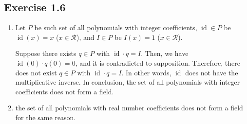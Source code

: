 \documentclass{article}
\theoremstyle{thmstyleone}
\theoremstyle{thmstyletwo}
\theoremstyle{thmstylethree}
\newcommand\R{\mathcal R}
\DeclareMathOperator \id{id}
\begin{document}
\subsection{Exercise 1.6}
\begin{enumerate}[label = (\alph*)]
\item
Let $P$ be such set of all polynomials with integer coefficients, %
$\id \in P$ be $\id(x) = x$ ($x \in \R$), and 
$I \in P$ be $I(x) = 1$ ($x \in \R$).

Suppose there exists $q \in P$ with ${\id} \cdot q = I$.
Then, we have $\id(0) \cdot q(0) = 0$, and it is contradicted to supposition.
Therefore, there does not exist  $q \in P$ with ${\id} \cdot q = I$. In other words, $\id$ does not have the multiplicative inverse.
In conclusion, the set of all polynomials with integer coefficients does not form a field.   
\item
the set of all polynomials with real number coefficients does not form a field for the same reason.   
\end{enumerate}
\end{document}
